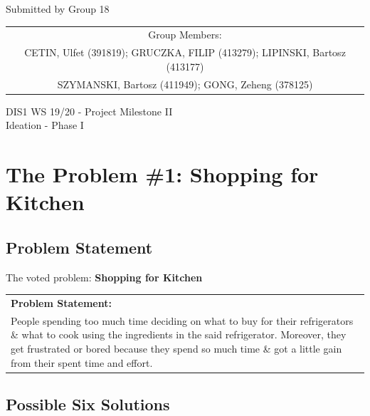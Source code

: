 \documentclass[a4paper,10pt,oneside]{scrreprt}
\begin{document}
\begin{center}
	Submitted by Group 18
	
	\bigskip
	
	\begin{tabular}{c}
	Group Members: \\
	CETIN, Ulfet (391819); GRUCZKA, FILIP (413279);	LIPINSKI, Bartosz (413177) \\
	SZYMANSKI, Bartosz (411949); GONG, Zeheng (378125)\\
	\end{tabular}

	\bigskip
	
	DIS1 WS 19/20 - Project Milestone II\\
	Ideation - Phase I\\
	
\end{center}
\vspace{0cm}

\begingroup
\let\clearpage\relax
	\chapter{The Problem \#1: Shopping for Kitchen}
\endgroup
		
	\section{Problem Statement}
		The voted problem: \textbf{Shopping for Kitchen}\\
		
		
	
		\begin{tabularx}{\textwidth}{|X|}
	
			\hline
				\textbf{Problem Statement:}\\
				
				People spending too much time deciding on what to buy for their refrigerators \& what to cook using the ingredients in the said refrigerator. Moreover, they get frustrated or bored because they spend so much time \& got a little gain from their spent time and effort.\\
				
			\hline
			
		\end{tabularx}
	
	
		
	\section{Possible Six Solutions}
	
\end{document}
